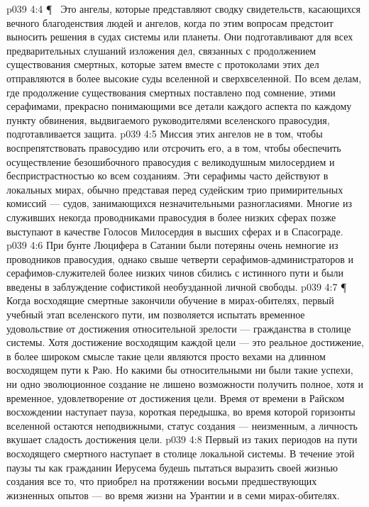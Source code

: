 \vs p039 4:4 \P\ \bibnobreakspace {} Это ангелы, которые представляют сводку свидетельств, касающихся вечного благоденствия людей и ангелов, когда по этим вопросам предстоит выносить решения в судах системы или планеты. Они подготавливают для всех предварительных слушаний изложения дел, связанных с продолжением существования смертных, которые затем вместе с протоколами этих дел отправляются в более высокие суды вселенной и сверхвселенной. По всем делам, где продолжение существования смертных поставлено под сомнение, этими серафимами, прекрасно понимающими все детали каждого аспекта по каждому пункту обвинения, выдвигаемого руководителями вселенского правосудия, подготавливается защита.
\vs p039 4:5 Миссия этих ангелов не в том, чтобы воспрепятствовать правосудию или отсрочить его, а в том, чтобы обеспечить осуществление безошибочного правосудия с великодушным милосердием и беспристрастностью ко всем созданиям. Эти серафимы часто действуют в локальных мирах, обычно представая перед судейским трио примирительных комиссий --- судов, занимающихся незначительными разногласиями. Многие из служивших некогда проводниками правосудия в более низких сферах позже выступают в качестве Голосов Милосердия в высших сферах и в Спасограде.
\vs p039 4:6 При бунте Люцифера в Сатании были потеряны очень немногие из проводников правосудия, однако свыше четверти серафимов\hyp{}администраторов и серафимов\hyp{}служителей более низких чинов сбились с истинного пути и были введены в заблуждение софистикой необузданной личной свободы.
\vs p039 4:7 \P\ \bibnobreakspace {} Когда восходящие смертные закончили обучение в мирах\hyp{}обителях, первый учебный этап вселенского пути, им позволяется испытать временное удовольствие от достижения относительной зрелости --- гражданства в столице системы. Хотя достижение восходящим каждой цели --- это реальное достижение, в более широком смысле такие цели являются просто вехами на длинном восходящем пути к Раю. Но какими бы относительными ни были такие успехи, ни одно эволюционное создание не лишено возможности получить полное, хотя и временное, удовлетворение от достижения цели. Время от времени в Райском восхождении наступает пауза, короткая передышка, во время которой горизонты вселенной остаются неподвижными, статус создания --- неизменным, а личность вкушает сладость достижения цели.
\vs p039 4:8 Первый из таких периодов на пути восходящего смертного наступает в столице локальной системы. В течение этой паузы ты как гражданин Иерусема будешь пытаться выразить своей жизнью создания все то, что приобрел на протяжении восьми предшествующих жизненных опытов --- во время жизни на Урантии и в семи мирах\hyp{}обителях.
